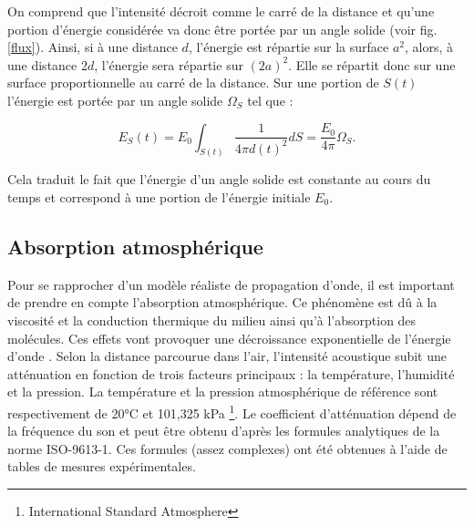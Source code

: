 On comprend que l'intensité décroit comme le carré de la distance et qu'une portion d'énergie considérée va donc être portée par un angle solide (voir fig. \ref{flux}). Ainsi, si à une distance $d$, l'énergie est répartie sur la surface $a^2$, alors, à une distance $2d$, l'énergie sera répartie sur $(2a)^2$. Elle se répartit donc sur une surface proportionnelle au carré de la distance. Sur une portion de $S(t)$ l'énergie est portée par un angle solide $\Omega_{S}$ tel que :

\begin{equation} \label{eq_energie}
E_{S}(t) = E_0 \int_{S(t)}  \frac{1}{4\pi  d(t)^2} dS = \frac{E_0}{4\pi}  \Omega_{S}.
\end{equation}

Cela traduit le fait que l'énergie d'un angle solide est constante au cours du temps et correspond à une portion de l'énergie initiale $E_0$.





\subsection{Absorption atmosphérique}
 \label{sect_absAIr}
Pour se rapprocher d'un modèle réaliste de propagation d'onde, il est important de prendre en compte l'absorption atmosphérique. Ce phénomène est dû à la viscosité et la conduction thermique du milieu ainsi qu'à l'absorption des molécules. Ces effets vont provoquer une décroissance exponentielle de l'énergie d'onde \cite[p. 68-70]{jouhaneau}. Selon la distance parcourue dans l'air, l'intensité acoustique subit une atténuation en fonction de trois facteurs principaux : la température, l'humidité et la pression. La température et la pression atmosphérique de référence sont respectivement de 20°C et 101,325 kPa \footnote{International Standard Atmosphere}. Le coefficient d'atténuation dépend de la fréquence du son et peut être obtenu d'après les formules analytiques de la norme ISO-9613-1. Ces formules (assez complexes) ont été obtenues à l'aide de tables de mesures expérimentales.


